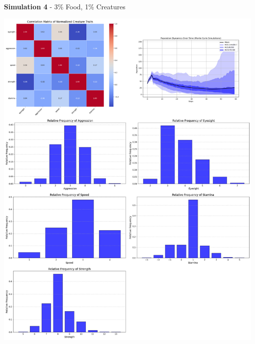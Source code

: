 \documentclass{article}
\begin{document}
\newpage
\textbf{Simulation 4} - 3\% Food, 1\% Creatures
\begin{center}
    \includegraphics[scale=0.21]{tests/1.4.jpg}
\end{center}
\end{document}
